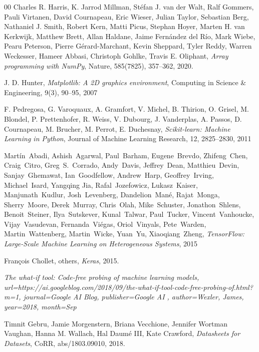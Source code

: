\documentclass[fleqn,10pt]{wlscirep}
\begin{document}
\begin{thebibliography}{00}
  Charles R. Harris, K. Jarrod Millman, St\'{e}fan J. van der Walt, Ralf Gommers, Pauli Virtanen, David Cournapeau, Eric Wieser, Julian Taylor, Sebastian Berg, Nathaniel J. Smith, Robert Kern, Matti Picus, Stephan Hoyer, Marten H. van Kerkwijk, Matthew Brett, Allan Haldane, Jaime Fern\'{a}ndez del R\'{i}o, Mark Wiebe, Pearu Peterson, Pierre G\'{e}rard-Marchant, Kevin Sheppard, Tyler Reddy, Warren Weckesser, Hameer Abbasi, Christoph Gohlke, Travis E. Oliphant,
  \textit{Array programming with {NumPy}},
  Nature,
  585(7825),
  357--362,
  2020.


  J. D. Hunter,
  \textit{Matplotlib: A 2D graphics environment},
  Computing in Science \& Engineering,
  9(3),
  90--95,
  2007  %


  F. Pedregosa, G. Varoquaux, A. Gramfort, V. Michel, B. Thirion, O. Grisel, M. Blondel, P. Prettenhofer, R. Weiss, V. Dubourg, J. Vanderplas, A. Passos, D. Cournapeau, M. Brucher, M. Perrot, E. Duchesnay,
  \textit{Scikit-learn: Machine Learning in {P}ython},
  Journal of Machine Learning Research,
  12,
  2825--2830,
  {2011}  %


  Mart\'{i}n~Abadi, Ashish~Agarwal, Paul~Barham, Eugene~Brevdo, Zhifeng~Chen, Craig~Citro, Greg~S.~Corrado, Andy~Davis, Jeffrey~Dean, Matthieu~Devin, Sanjay~Ghemawat, Ian~Goodfellow, Andrew~Harp, Geoffrey~Irving, Michael~Isard, Yangqing Jia, Rafal~Jozefowicz, Lukasz~Kaiser, Manjunath~Kudlur, Josh~Levenberg, Dandelion~Man\'{e}, Rajat~Monga, Sherry~Moore, Derek~Murray, Chris~Olah, Mike~Schuster, Jonathon~Shlens, Benoit~Steiner, Ilya~Sutskever, Kunal~Talwar, Paul~Tucker, Vincent~Vanhoucke, Vijay~Vasudevan, Fernanda~Vi\'{e}gas, Oriol~Vinyals, Pete~Warden, Martin~Wattenberg, Martin~Wicke, Yuan~Yu, Xiaoqiang~Zheng,
  \textit{{TensorFlow}: Large-Scale Machine Learning on Heterogeneous Systems},
  {2015}   %


  Fran\c{c}ois Chollet, others,
  \textit{Keras},
  2015.


  \textit{{The what-if tool: Code-free probing of machine learning models}, url={https://ai.googleblog.com/2018/09/the-what-if-tool-code-free-probing-of.html?m=1}, journal={Google AI Blog}, publisher={Google AI }, author={Wexler, James}, year={2018}, month={Sep}}  %
  


  Timnit Gebru, Jamie Morgenstern, Briana Vecchione, Jennifer Wortman Vaughan, Hanna M. Wallach, Hal Daum\'{e} III, Kate Crawford,
  \textit{Datasheets for Datasets},
  CoRR,
  abs/1803.09010,
  2018.



\end{thebibliography}
\end{document}
